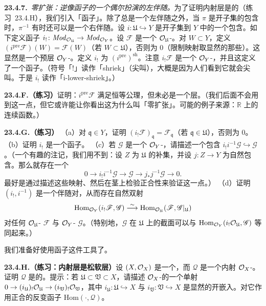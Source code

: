 \textbf{23.4.7.}\ \emph{零扩张：逆像函子的一个偶尔扮演的左伴随。}\quad 为了证明内射层是\trFlasque{}的（\mbox{练习~23.4.H}），我们引入「\textbf{\trExtensionByZero}函子」。除了总是一个左伴随之外，当 $\pi$ 是开子集的包含时，$\pi^{-1}$ 有时还可以是一个右伴随。设 $i\colon\mathfrak{U}\hookrightarrow Y$ 是开子集到 $Y$ 中的一个包含。如下定义\textbf{\trExtensionByZero}函子 $i_!\colon\mathit{Mod}_{\mathcal{O}_\mathfrak{U}}\to\mathit{Mod}_{\mathcal{O}_Y}$。设 $\mathscr{F}$ 是一个 $\mathcal{O}_\mathfrak{U}$-\trModule。对 $W\subset Y$，定义 $(i^{\mathrm{pre}}\mathscr{F})(W)=\mathscr{F}(W)$（若 $W\subset\mathfrak{U}$），否则为 $0$（限制映射取显然的那些）。这显然是一个预层 $\mathcal{O}_Y$-\trModule。定义 $i_!$ 为 $(i^{\mathrm{pre}})^{\mathrm{sh}}$。注意 $i_!\mathscr{F}$ 是一个 $\mathcal{O}_Y$-\trModule，并且这定义了一个函子。（符号「$!$」读作「shriek」（尖叫），大概是因为人们看到它就会尖叫。于是 $i_!$ 读作「i-lower-shriek」。）

\textbf{23.4.F.（练习）}\quad 证明：$i^{\mathrm{pre}}\mathscr{F}$ 满足恒等公理，但未必是一个层。（我们后面不会用到这一点，但它或许能让你看出这为什么叫「零扩张」。可能的例子来源：$\mathbb{R}$ 上的连续函数。）

\textbf{23.4.G.（练习）}\quad
（a）对 $\mathfrak{q}\in Y$，证明 $(i_!\mathscr{F})_\mathfrak{q}=\mathscr{F}_\mathfrak{q}$（若 $\mathfrak{q}\in\mathfrak{U}$），否则为 $0$。
（b）证明 $i_!$ 是一个\trExact{}函子。
（c）若 $\mathscr{G}$ 是一个 $\mathcal{O}_Y$-\trModule，请描述一个包含 $i_!i^{-1}\mathscr{G}\hookrightarrow\mathscr{G}$。（一个有趣的注记，我们用不到：设 $Z$ 为 $\mathfrak{U}$ 的补集，并设 $j\colon Z\to Y$ 为自然包含。那么就存在一个\trShortExactSequence
\[
0 \longrightarrow i_!i^{-1}\mathscr{G} \longrightarrow \mathscr{G} \longrightarrow j_\ast j^{-1}\mathscr{G} \longrightarrow 0.
\]
最好是通过描述这些映射、然后在茎上检验正合性来验证这一点。）
（d）证明 $(i_!,i^{-1})$ 是一个伴随对，从而存在自然双射
\[
\mathrm{Hom}_{\mathcal{O}_Y}(i_!\mathscr{F},\mathscr{G})\overset{\sim}{\longrightarrow}\mathrm{Hom}_{\mathcal{O}_\mathfrak{U}}(\mathscr{F},\mathscr{G}|_\mathfrak{U})
\]
对任何 $\mathcal{O}_\mathfrak{U}$-\trModule{} $\mathscr{F}$ 与 $\mathcal{O}_Y$-\trModule{} $\mathscr{G}$。（特别地，$\mathscr{G}$ 在 $\mathfrak{U}$ 上的截面可以与 $\mathrm{Hom}_{\mathcal{O}_Y}(i_!\mathcal{O}_\mathfrak{U},\mathscr{G})$ 等同起来。）

我们准备好使用\trExtensionByZero{}函子这件工具了。

\textbf{23.4.H.（练习：内射层是松软层）}\quad 设 $(X,\mathcal{O}_X)$ 是一个\trRingedSpace，而 $\mathscr{Q}$ 是一个内射 $\mathcal{O}_X$-\trModule。证明 $\mathscr{Q}$ 是\trFlasque{}的。提示：若 $\mathfrak{U}\subset\mathfrak{V}\subset X$，请描述 $\mathcal{O}_X$-\trModule{}的一个单射 $0\to(i_\mathfrak{U})_!\mathcal{O}_\mathfrak{U}\to(i_\mathfrak{V})_!\mathcal{O}_\mathfrak{V}$，其中 $i_\mathfrak{U}\colon\mathfrak{U}\hookrightarrow X$ 与 $i_\mathfrak{V}\colon\mathfrak{V}\hookrightarrow X$ 是显然的开嵌入。对它作用正合的反变函子 $\mathrm{Hom}(\cdot,\mathscr{Q})$。

